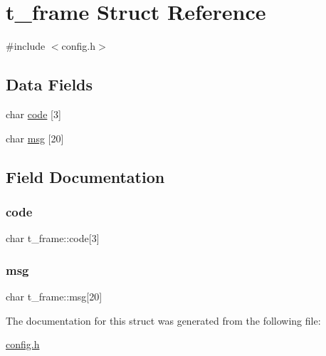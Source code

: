 \hypertarget{structt__frame}{}\section{t\+\_\+frame Struct Reference}
\label{structt__frame}


{\ttfamily \#include $<$config.\+h$>$}

\subsection*{Data Fields}
\begin{DoxyCompactItemize}
\item 
char \mbox{\hyperlink{structt__frame_a69c5abed226d1fb782ac8c922c778767}{code}} \mbox{[}3\mbox{]}
\item 
char \mbox{\hyperlink{structt__frame_a57f62f9436b3384b5e6a226a086a5ef3}{msg}} \mbox{[}20\mbox{]}
\end{DoxyCompactItemize}


\subsection{Field Documentation}
\mbox{\label{structt__frame_a69c5abed226d1fb782ac8c922c778767}} 
\subsubsection{\texorpdfstring{code}{code}}
{\footnotesize\ttfamily char t\+\_\+frame\+::code\mbox{[}3\mbox{]}}

\mbox{\label{structt__frame_a57f62f9436b3384b5e6a226a086a5ef3}} 
\subsubsection{\texorpdfstring{msg}{msg}}
{\footnotesize\ttfamily char t\+\_\+frame\+::msg\mbox{[}20\mbox{]}}



The documentation for this struct was generated from the following file\+:\begin{DoxyCompactItemize}
\item 
\mbox{\hyperlink{config_8h}{config.\+h}}\end{DoxyCompactItemize}

